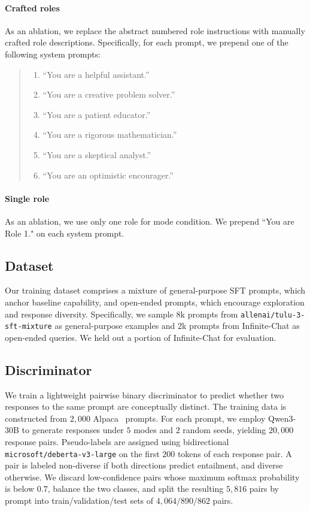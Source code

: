 \paragraph{Crafted roles}
As an ablation, we replace the abstract numbered role instructions with manually
crafted role descriptions. Specifically, for each prompt, we prepend one of the
following system prompts:
\begin{quote}
\small
\begin{enumerate}
    \item ``You are a helpful assistant.''
    \item ``You are a creative problem solver.''
    \item ``You are a patient educator.''
    \item ``You are a rigorous mathematician.''
    \item ``You are a skeptical analyst.''
    \item ``You are an optimistic encourager.''
\end{enumerate}
\end{quote}

\paragraph{Single role}
As an ablation, we use only one role for mode condition. We prepend ``You are Role 1." on each system prompt.

\subsection{Dataset}
\label{appx:dataset}
Our training dataset comprises a mixture of general-purpose SFT prompts, which anchor baseline capability, and open-ended prompts, which encourage exploration and response diversity. Specifically, we sample 8k prompts from \texttt{allenai/tulu-3-sft-mixture} \citep{lambert2024tulu3} as general-purpose examples and 2k prompts from Infinite-Chat as open-ended queries. We held out a portion of Infinite-Chat for evaluation.

\subsection{Discriminator}
\label{appx:discriminator}
We train a lightweight pairwise binary discriminator to predict whether two responses to the same prompt are conceptually distinct. The training data is constructed from \(2{,}000\) Alpaca~\citep{alpaca} prompts. For each
prompt, we employ Qwen3-30B to generate responses under \(5\) modes and \(2\) random seeds,
yielding \(20{,}000\) response pairs. Pseudo-labels are assigned using bidirectional \texttt{microsoft/deberta-v3-large} on the first \(200\) tokens of each response pair. A pair is labeled non-diverse if both directions predict entailment, and diverse otherwise. We discard low-confidence pairs
whose maximum softmax probability is below \(0.7\), balance the two classes, and split the resulting \(5{,}816\) pairs by prompt into train/validation/test sets of \(4{,}064/890/862\) pairs.

